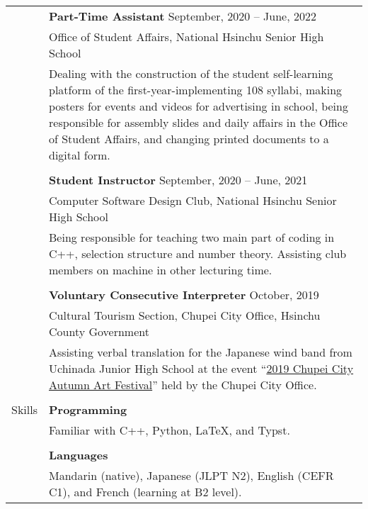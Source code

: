 \documentclass[letterpaper, 11pt]{article}
\begin{document}
\begin{center}
\begin{longtable}{p{0.76in}p{5.93in}}
        & \textbf{Part-Time Assistant} \hfill September, 2020 -- June, 2022 \\
        & Office of Student Affairs, National Hsinchu Senior High School\\
        & Dealing with the construction of the student self-learning platform of the first-year-implementing 108 syllabi, making posters for events and videos for advertising in school, being responsible for assembly slides and daily affairs in the Office of Student Affairs, and changing printed documents to a digital form.\\
        & \\

        & \textbf{Student Instructor} \hfill September, 2020 -- June, 2021 \\
        & Computer Software Design Club, National Hsinchu Senior High School\\
        & Being responsible for teaching two main part of coding in C++, selection structure and number theory. Assisting club members on machine in other lecturing time.\\
        & \\

        & \textbf{Voluntary Consecutive Interpreter} \hfill October, 2019\\
        & Cultural Tourism Section, Chupei City Office, Hsinchu County Government\\
        & Assisting verbal translation for the Japanese wind band from Uchinada Junior High School at the event ``\href{https://www.zhubei.gov.tw/travel/p2_1_2.php?bigact_id=111}{2019 Chupei City Autumn Art Festival}'' held by the Chupei City Office.\\
        & \\
        
        
        {\textcolor{OliveGreen}{Skills}} 
        & \textbf{Programming}\\
        & Familiar with C++, Python, \LaTeX, and Typst. \\
        & \\
        
        & \textbf{Languages} \\
        & Mandarin (native), Japanese (JLPT N2), English (CEFR C1), and French (learning at B2 level). \\
        
        
    \end{longtable}
\end{center}
\end{document}
